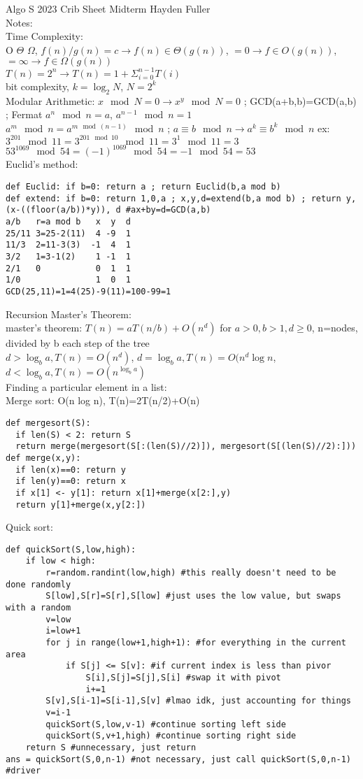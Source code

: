 \documentclass{article}
\begin{document}
Algo S 2023 Crib Sheet Midterm Hayden Fuller
\\\noindent Notes:
\\\indent Time Complexity:
\\O $\Theta$ $\Omega$, $ f(n)/g(n)=c \rightarrow f(n)\in \Theta(g(n))$, $=0 \rightarrow f\in O(g(n))$, $=\infty \rightarrow f\in \Omega(g(n))$
\\$T(n)=2^n \rightarrow T(n)=1+\Sigma_{i=0}^{n-1}T(i)$
\\bit complexity, $k=\log_2N$, $N=2^k$
\\\indent Modular Arithmetic: $x \mod N =0 \rightarrow x^y \mod N =0$ ; GCD(a+b,b)=GCD(a,b) ; Fermat $a^n \mod n = a$, $a^{n-1} \mod n = 1$
\\$a^m\mod n = a^{m\mod (n-1)}\mod n$ ; $a\equiv b\mod n \rightarrow a^k\equiv b^k \mod n$ ex: $3^{201}\mod11=3^{201\mod 10}\mod11=3^1\mod11=3$
\\$53^{1069}\mod54=(-1)^{1069}\mod54=-1\mod54=53$
\\Euclid's method: \begin{verbatim}
def Euclid: if b=0: return a ; return Euclid(b,a mod b)
def extend: if b=0: return 1,0,a ; x,y,d=extend(b,a mod b) ; return y, (x-((floor(a/b))*y)), d #ax+by=d=GCD(a,b)
a/b   r=a mod b   x  y  d
25/11 3=25-2(11)  4 -9  1
11/3  2=11-3(3)  -1  4  1
3/2   1=3-1(2)    1 -1  1
2/1   0           0  1  1
1/0               1  0  1
GCD(25,11)=1=4(25)-9(11)=100-99=1\end{verbatim} %
\indent Recursion  Master's Theorem:
\\master's theorem: $T(n)=aT(n/b)+O(n^d)$ for $a>0, b>1, d\ge0$, n=nodes, divided by b each step of the tree
\\$d>\log_ba, T(n)=O(n^d)$, $d=\log_ba, T(n)=O(n^d\log n$, $d<\log_ba, T(n)=O(n^{\log_ba})$
\\\indent Finding a particular element in a list:
\\Merge sort: O(n log n), T(n)=2T(n/2)+O(n)
\begin{verbatim}
def mergesort(S): 
  if len(S) < 2: return S
  return merge(mergesort(S[:(len(S)//2)]), mergesort(S[(len(S)//2):]))
def merge(x,y): 
  if len(x)==0: return y
  if len(y)==0: return x
  if x[1] <- y[1]: return x[1]+merge(x[2:],y)
  return y[1]+merge(x,y[2:])
\end{verbatim}
Quick sort:
\begin{verbatim}
def quickSort(S,low,high):
    if low < high:
        r=random.randint(low,high) #this really doesn't need to be done randomly
        S[low],S[r]=S[r],S[low] #just uses the low value, but swaps with a random
        v=low
        i=low+1
        for j in range(low+1,high+1): #for everything in the current area
            if S[j] <= S[v]: #if current index is less than pivor
                S[i],S[j]=S[j],S[i] #swap it with pivot
                i+=1
        S[v],S[i-1]=S[i-1],S[v] #lmao idk, just accounting for things
        v=i-1
        quickSort(S,low,v-1) #continue sorting left side
        quickSort(S,v+1,high) #continue sorting right side
    return S #unnecessary, just return
ans = quickSort(S,0,n-1) #not necessary, just call quickSort(S,0,n-1) #driver
\end{verbatim}
\end{document}

